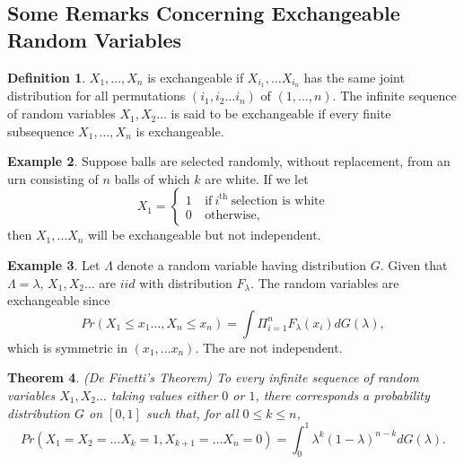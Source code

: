 \documentclass[a4paper,10pt]{article}
\theoremstyle{plain}
\newtheorem{thm}{Theorem}[section]
\theoremstyle{definition}
\newtheorem{defn}[thm]{Definition}
\newtheorem{exmp}[thm]{Example}
\theoremstyle{remark}
\begin{document}
\subsection{Some Remarks Concerning Exchangeable Random Variables}
\begin{defn}
$X_1, \hdots ,X_n$ is exchangeable if $X_{i_1}, \hdots X_{i_n}$ has the same joint distribution for all permutations $(i_1,i_2 \hdots i_n)$ of $(1, \hdots ,n)$. The infinite sequence of random variables $X_1, X_2 \hdots$ is said to be exchangeable if every finite subsequence $X_1, \hdots ,X_n$ is exchangeable.
\end{defn}
\begin{exmp}
Suppose balls are selected randomly, without replacement, from an urn consisting of $n$ balls of which $k$ are white. If we let
\begin{displaymath}
   X_1 = \left\{
     \begin{array}{lr}
       1 & ~\text{if}~ i^{\text{th}}~ \text{selection is white} \\
       0 & ~\text{otherwise},
     \end{array}
   \right.
\end{displaymath}
then $X_1, \hdots X_n$ will be exchangeable but not independent. 
\end{exmp}
\begin{exmp}
Let $\Lambda$ denote a random variable having distribution $G$. Given that $\Lambda= \lambda$, $X_1, X_2 \hdots$ are $iid$ with distribution $F_\lambda$. The random variables are exchangeable since
\begin{equation*}
Pr(X_1 \leq x_1 \hdots , X_n \leq x_n) = \int \Pi_{i=1}^nF_\lambda(x_i)dG(\lambda),
\end{equation*}
which is symmetric in $(x_1, \hdots x_n)$. The are not independent.
\end{exmp}
\begin{thm}
(De Finetti's Theorem) To every infinite sequence of random variables $X_1, X_2 \hdots $ taking values either $0$ or $1$, there corresponds a probability distribution $G$ on $[0,1]$ such that, for all $0 \leq k \leq n$,
\begin{equation*}
\label{De Finetti}
Pr(X_1=X_2= \hdots X_k =1, X_{k+1}= \hdots X_n = 0)= \int_{0}^{1}\lambda^k(1-\lambda)^{n-k}dG(\lambda).
\end{equation*}  
\end{thm}
\end{document}
